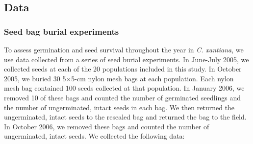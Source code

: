 \documentclass[12pt, oneside, titlepage]{article}   	%
\begin{document}


\subsection*{Data}

\subsubsection*{Seed bag burial experiments}

To assess germination and seed survival throughout the year in \textit{C. xantiana}, we use data collected from a series of seed burial experiments. In June-July 2005, we collected seeds at each of the 20 populations included in this study. In October 2005, we buried 30 5$\times$5-cm nylon mesh bags at each population. Each nylon mesh bag contained 100 seeds collected at that population. In January 2006, we removed 10 of these bags and counted the number of germinated seedlings and the number of ungerminated, intact seeds in each bag. We then returned the ungerminated, intact seeds to the resealed bag and returned the bag to the field. In October 2006, we removed these bags and counted the number of ungerminated, intact seeds. We collected the following data:
\end{document}
